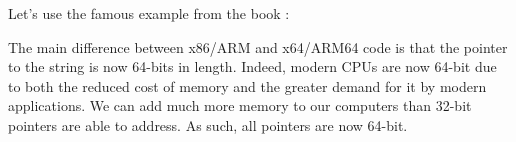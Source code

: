 \chapterold{\HelloWorldSectionName}
\label{sec:helloworld}

Let's use the famous example from the book \KRBook:














\sectionold{\Conclusion{}}

The main difference between x86/ARM and x64/ARM64 code is that the pointer to the string is now 64-bits in length.
Indeed, modern \ac{CPU}s are now 64-bit due to both the reduced cost of memory and the greater demand for it by modern applications. 
We can add much more memory to our computers than 32-bit pointers are able to address.
As such, all pointers are now 64-bit.



